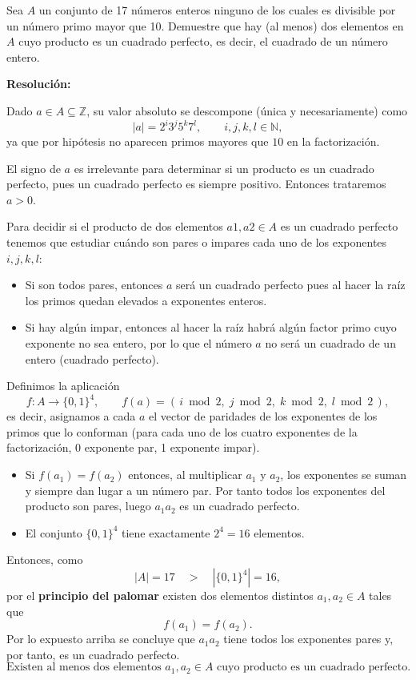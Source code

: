 \documentclass[a4paper,12pt]{article}
\begin{document}
\begin{ejercicio}[title=Ejercicio 42 (⋆)]
Sea $A$ un conjunto de 17 números enteros ninguno de los cuales es divisible por un número primo mayor que 10.  
Demuestre que hay (al menos) dos elementos en $A$ cuyo producto es un cuadrado perfecto, es decir, el cuadrado de un número entero.

\tcblower
\textbf{Resolución:}

Dado $a\in A \subseteq \mathbb{Z}$, su valor absoluto se descompone (única y necesariamente) como
\[
|a|=2^{i}3^{j}5^{k}7^{l},\qquad i,j,k,l\in\mathbb{N},
\]
ya que por hipótesis no aparecen primos mayores que $10$ en la factorización.

\vspace{0.5em}

El signo de $a$ es irrelevante para determinar si un producto es un cuadrado perfecto, pues un cuadrado perfecto es siempre positivo. Entonces trataremos $a > 0$.

\vspace{0.5em}

Para decidir si el producto de dos elementos $a1, a2 \in A$ es un cuadrado perfecto tenemos que estudiar cuándo son pares o impares cada uno de los exponentes $i,j,k,l$:
\begin{itemize}
\item Si son todos pares, entonces $a$ será un cuadrado perfecto pues al hacer la raíz los primos quedan elevados a exponentes enteros.
\item Si hay algún impar, entonces al hacer la raíz habrá algún factor primo cuyo exponente no sea entero, por lo que el número $a$ no será un cuadrado de un entero (cuadrado perfecto).
\end{itemize}

Definimos la aplicación
\[
f:A\longrightarrow\{0,1\}^{4},\qquad
f(a)=(\,i\bmod 2,\; j\bmod 2,\; k\bmod 2,\; l\bmod 2\,),
\]
es decir, asignamos a cada $a$ el vector de paridades de los exponentes de los primos que lo conforman (para cada uno de los cuatro exponentes de la factorización, 0 exponente par, 1 exponente impar).

\begin{itemize}
  \item Si $f(a_1)=f(a_2)$ entonces, al multiplicar $a_1$ y $a_2$, los exponentes se suman y siempre dan lugar a un número par. Por tanto todos los exponentes del producto son pares, luego $a_1a_2$ es un cuadrado perfecto.
  \item El conjunto $\{0,1\}^{4}$ tiene exactamente $2^{4}=16$ elementos.
\end{itemize}

Entonces, como 
\[
|A| = 17 \quad > \quad |\{0,1\}^4| = 16,
\]
por el \textbf{principio del palomar} existen dos elementos distintos $a_1,a_2\in A$ tales que
\[
f(a_1)=f(a_2).
\]
Por lo expuesto arriba se concluye que $a_1a_2$ tiene todos los exponentes pares y, por tanto, es un cuadrado perfecto.
\[
\boxed{\text{Existen al menos dos elementos }a_1,a_2\in A\text{ cuyo producto}\text{ es un cuadrado perfecto.}}
\]

\end{ejercicio}
\end{document}
